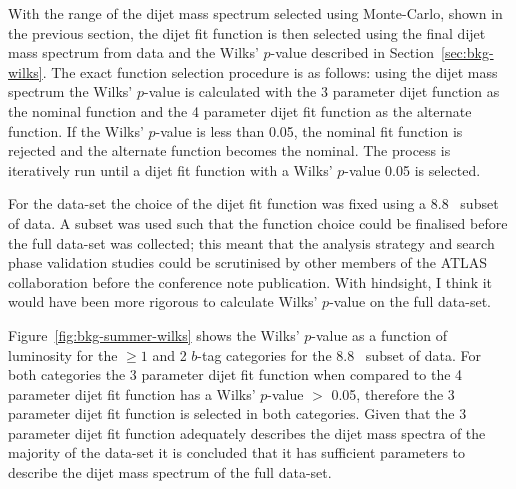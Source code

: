 With the range of the dijet mass spectrum selected using Monte-Carlo, shown in the previous section,
the dijet fit function is then selected using the final dijet mass spectrum from data and the Wilks' $p$-value described in Section~\ref{sec:bkg-wilks}.
The exact function selection procedure is as follows:
using the dijet mass spectrum the Wilks' \mbox{$p$-value} is calculated with
the 3 parameter dijet function as the nominal function and the 4 parameter dijet fit function as the alternate function.
If the Wilks' \mbox{$p$-value} is less than 0.05, the nominal fit function is rejected and the alternate function becomes the nominal.
The process is iteratively run until a dijet fit function with a Wilks' \mbox{$p$-value} \gt{} 0.05 is selected.

For the \summer{} data-set the choice of the dijet fit function was fixed using a 8.8~\ifb{} subset of data.
A subset was used such that the function choice could be finalised before the full data-set was collected;
this meant that the analysis strategy and search phase validation studies could be scrutinised by other members of the ATLAS collaboration before the conference note publication.
With hindsight, I think it would have been more rigorous to calculate Wilks' \mbox{$p$-value} on the full data-set.

Figure~\ref{fig:bkg-summer-wilks} shows the Wilks' \mbox{$p$-value} as a function of luminosity
for the $\geq1$ and 2 \mbox{$b$-tag} categories for the 8.8~\ifb{} subset of data.
For both categories the 3 parameter dijet fit function when compared to the 4 parameter dijet fit function
has a Wilks' \mbox{$p$-value} $>$ 0.05,
therefore the 3 parameter dijet fit function is selected in both categories.
Given that the 3 parameter dijet fit function adequately describes the dijet mass spectra of the
majority of the data-set it is concluded that it has sufficient parameters to describe the dijet mass spectrum of the full data-set.

